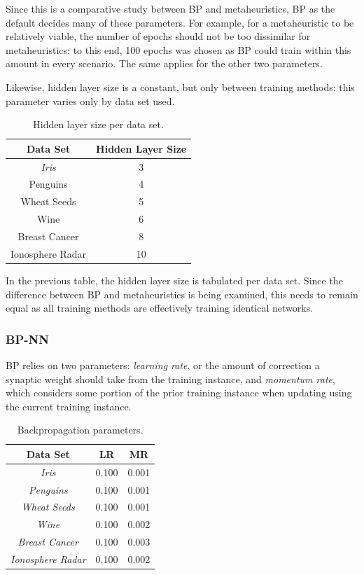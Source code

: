 \documentclass[a4paper,12pt]{article}
\begin{document}
Since this is a comparative study between BP and metaheuristics, BP as the default decides many of these parameters. For example, for a metaheuristic to be relatively viable, the number of epochs should not be too dissimilar for metaheuristics: to this end, 100 epochs was chosen as BP could train within this amount in every scenario. The same applies for the other two parameters.

Likewise, hidden layer size is a constant, but only between training methods: this parameter varies only by data set used.

\begin{table}[h!]
\centering
\begin{tabular}{|c|c|}
\hline
\textbf{Data Set} & \textbf{Hidden Layer Size} \\ \hline
\textit{Iris} & 3 \\ \hline
Penguins & 4 \\ \hline
Wheat Seeds & 5 \\ \hline
Wine & 6 \\ \hline
Breast Cancer & 8 \\ \hline
Ionosphere Radar & 10 \\ \hline
\end{tabular}
\caption{Hidden layer size per data set.}
\label{Tab:hl-tab}
\end{table}

In the previous table, the hidden layer size is tabulated per data set. Since the difference between BP and metaheuristics is being examined, this needs to remain equal as all training methods are effectively training identical networks.

\subsubsection{BP-NN}

BP relies on two parameters: \textit{learning rate}, or the amount of correction a synaptic weight should take from the training instance, and \textit{momentum rate}, which considers some portion of the prior training instance when updating using the current training instance.

\begin{table}[h!]
\centering
\begin{tabular}{|c|c|c|}
\hline
\textbf{Data Set} & \textbf{LR} & \textbf{MR} \\ \hline
\textit{Iris} & 0.100 & 0.001 \\ \hline
\textit{Penguins} & 0.100 & 0.001 \\ \hline
\textit{Wheat Seeds} & 0.100 & 0.001 \\ \hline
\textit{Wine} & 0.100 & 0.002 \\ \hline
\textit{Breast Cancer} & 0.100 & 0.003 \\ \hline
\textit{Ionosphere Radar} & 0.100 & 0.002 \\ \hline
\end{tabular}
\caption{Backpropagation parameters.}
\label{Tab:bp-par}
\end{table}
\end{document}
